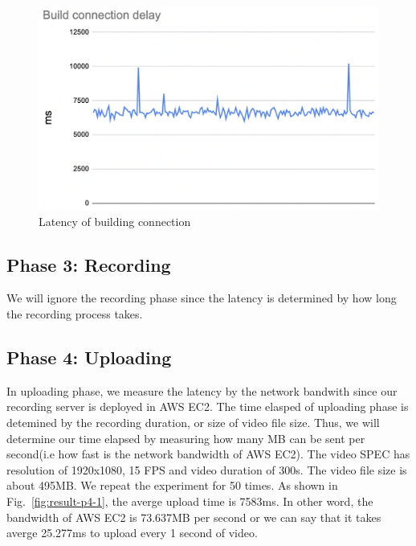 \begin{figure}[H]
    \centering
    \includegraphics[width=\textwidth]{figsrc/result-p2-3.png}
    \caption{Latency of building connection\label{fig:result-p2-3}}
\end{figure}

\subsection{Phase 3: Recording}
We will ignore the recording phase since the latency is determined by how long the recording process takes.

\subsection{Phase 4: Uploading}
In uploading phase, we measure the latency by the network bandwith since our recording server is deployed in AWS EC2. The time elasped of uploading phase is detemined by the recording duration, or size of video file size. Thus, we will determine our time elapsed by measuring how many MB can be sent per second(i.e how fast is the network bandwidth of AWS EC2). The video SPEC has resolution of 1920x1080, 15 FPS and video duration of 300s. The video file size is about 495MB. We repeat the experiment for 50 times. As shown in Fig.~\ref{fig:result-p4-1}, the averge upload time is 7583ms. In other word, the bandwidth of AWS EC2 is 73.637MB per second or we can say that it takes averge 25.277ms to upload every 1 second of video.

